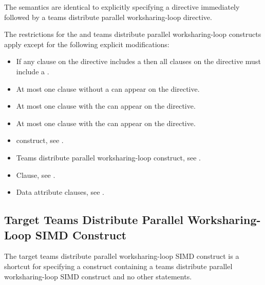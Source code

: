 \descr
The semantics are identical to explicitly specifying a 
directive immediately followed by a teams distribute parallel worksharing-loop directive.


\restrictions
The restrictions for the  and teams distribute parallel
worksharing-loop constructs apply except for the following explicit modifications:

\begin{itemize}
\item If any  clause on the directive includes a
       then all  clauses
      on the directive must include a .

\item At most one  clause without a
       can appear on the directive.

\item At most one  clause with the 
       can appear on the directive.

\item At most one  clause with the 
       can appear on the directive.
\end{itemize}

\crossreferences
\begin{itemize}
\item {} construct, see .

\item Teams distribute parallel worksharing-loop construct, see
      .

\item {} Clause, see .

\item Data attribute clauses, see
      .
\end{itemize}










\subsection{Target Teams Distribute Parallel Worksharing-Loop SIMD Construct}
\label{subsec:Target Teams Distribute Parallel Loop SIMD Construct}
\summary
The target teams distribute parallel worksharing-loop SIMD construct is a shortcut for specifying a 
construct containing a teams distribute parallel worksharing-loop SIMD construct and no other statements.

